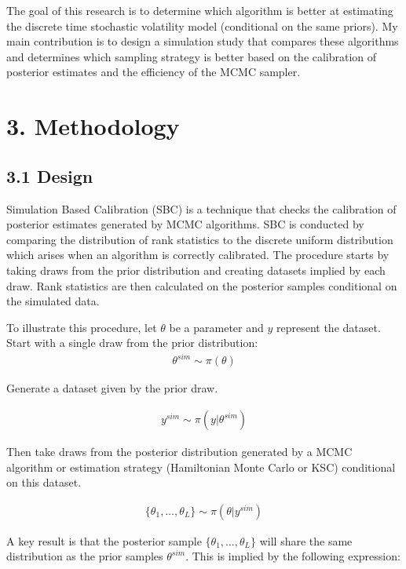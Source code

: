 \documentclass[
  12pt,
  letterpaper,
  DIV=11,
  numbers=noendperiod]{scrartcl}
\begin{document}
The goal of this research is to determine which algorithm is better at
estimating the discrete time stochastic volatility model (conditional on
the same priors). My main contribution is to design a simulation study
that compares these algorithms and determines which sampling strategy is
better based on the calibration of posterior estimates and the
efficiency of the MCMC sampler.

\hypertarget{methodology}{%
\section{3. Methodology}\label{methodology}}

\hypertarget{design}{%
\subsection{3.1 Design}\label{design}}

Simulation Based Calibration (SBC) is a technique that checks the
calibration of posterior estimates generated by MCMC algorithms. SBC is
conducted by comparing the distribution of rank statistics to the
discrete uniform distribution which arises when an algorithm is
correctly calibrated. The procedure starts by taking draws from the
prior distribution and creating datasets implied by each draw. Rank
statistics are then calculated on the posterior samples conditional on
the simulated data.

To illustrate this procedure, let \(\theta\) be a parameter and \(y\)
represent the dataset. Start with a single draw from the prior
distribution: \[
\begin{aligned}
\theta^{sim} \sim \pi(\theta)
\end{aligned}
\]

Generate a dataset given by the prior draw.

\[
\begin{aligned}
y^{sim} \sim \pi (y|\theta^{sim})
\end{aligned}
\]

Then take draws from the posterior distribution generated by a MCMC
algorithm or estimation strategy (Hamiltonian Monte Carlo or KSC)
conditional on this dataset.

\[
\begin{aligned}
\{\theta_1,\dots , \theta_{L}\} \sim \pi (\theta | y^{sim})
\end{aligned}
\]

A key result is that the posterior sample
\(\{\theta_1,\dots , \theta_{L}\}\) will share the same distribution as
the prior samples \(\theta^{sim}\). This is implied by the following
expression:
\end{document}
